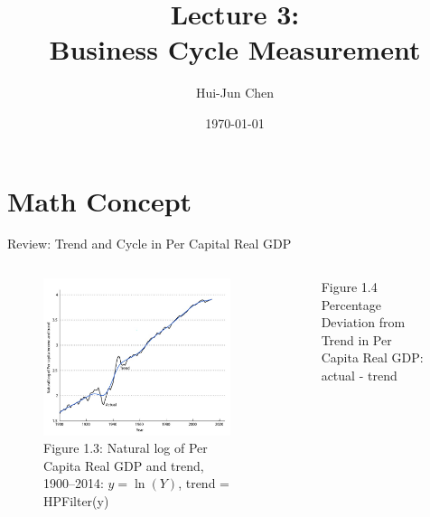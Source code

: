 \documentclass[11pt,aspectratio=169,usenames,dvipsnames]{beamer}
\title[Lecture 1]{Lecture 3: \\Business Cycle Measurement}
\author[Hui-Jun Chen]{Hui-Jun Chen}
\institute{National Tsing Hua University}
\date{\today}
\begin{document}
\begin{frame}[plain]
    \titlepage
\end{frame}

\section{Math Concept}
\label{sec:Math_Concept}

\begin{frame}{Review: Trend and Cycle in Per Capital Real GDP}
\label{slide:Review__Trend_and_Cycle_in_Per_Capital_Real_GDP}
\begin{columns}
    \begin{column}{0.5\textwidth}
        \begin{figure}
            \caption{Figure 1.3: Natural log of Per Capita Real GDP and trend, 1900–2014: \alert{$y = \ln(Y)$, trend = HPFilter(y)}}
            \includegraphics[width=\textwidth]{./figures/Figure1_3.jpg}
        \end{figure}
    \end{column}
    \begin{column}{0.5\textwidth}
        \begin{figure}
            \caption{Figure 1.4 Percentage Deviation from Trend in Per Capita Real GDP: \alert{actual - trend}}

\end{figure}
\end{column}
\end{columns}
\end{frame}
\end{document}
